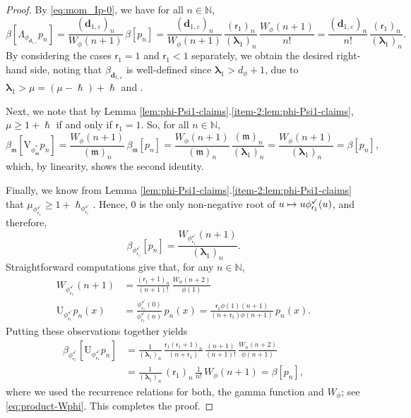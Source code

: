\documentclass[10pt]{amsart}
\let\epsilon\varepsilon
\newcommand\mto{\mathchoice{\longmapsto}{\mapsto}{\mapsto}{\mapsto}}
\theoremstyle{plain}
\theoremstyle{definition}
\newcommand{\N}{\mathbb{N}}
\newcommand{\m}{\mathfrak{m}}
\newcommand{\dz}{{\bm{d}}_{1,\epsilon}}
\newcommand{\lam}{{\bm{\lambda}_1}}
\newcommand{\vat}{{\mathsf{r}_1}}
\newcommand{\phm}{{\phi_\m^*}}
\renewcommand{\varphi}{{\phi_{\vat}^{\checkmark}}}
\newcommand{\gab}[1][\lam,\mo]{{\beta_{#1}}}
\let\h\hslash
\let\mo\mu
\let\bpsi\beta
\begin{document}
\begin{proof}
By \eqref{eq:mom_Ip-0}, we have for all $n \in \N$,
\begin{equation*}
\bpsi[\Lambda_{\phi_{\dz}} p_n] = \frac{(\dz)_n}{W_{\phi}(n+1)}\, \bpsi[p_n]=
\frac{(\dz)_n}{W_{\phi}(n+1)}\, \frac{(\vat)_n}{(\lam)_n}\,\frac{W_{\phi}(n+1)}{n!} =\frac{(\dz)_n}{n!}\, \frac{(\vat)_n}{(\lam)_n}.
\end{equation*}
By considering the cases $\vat=1$ and $\vat<1$ separately, we obtain the desired right-hand side, noting that $\gab[\dz]$ is well-defined since $\lam > d_\phi +1$, due to $ \lam > \mo = (\mo-\h) + \h$ and \cite[Prop.\,4.4(1)]{Patie-Savov-GeL}.

Next, we note that by Lemma \ref{lem:phi-Psi1-claims}.\eqref{item-2:lem:phi-Psi1-claims},
$\mo \geq 1+\h$ if and only if $\vat = 1$. So, for all $n \in \N$,
\begin{equation*}
\gab[\m] [\mathrm{V}_{\phm} p_n] = \frac{W_{\phi}(n+1)}{(\m)_n}\, \gab[\m] [p_n] = \frac{W_{\phi}(n+1)}{(\m)_n}\, \frac{(\m)_n}{(\lam)_n} = \frac{W_{\phi}(n+1)}{(\lam)_n} = \bpsi[p_n],
\end{equation*}
which, by linearity, shows the second identity.

Finally, we know from Lemma \ref{lem:phi-Psi1-claims}.\eqref{item-2:lem:phi-Psi1-claims} that
$\mo_\varphi \geq 1+\h_\varphi$. Hence, $0$ is the only non-negative root of $u \mto u\varphi(u)$, and therefore,
\begin{equation*}
\bpsi_\varphi [p_n] = \frac{W_\varphi(n+1)}{(\lam)_n}.
\end{equation*}
Straightforward computations give that, for any $n \in \N$,
\begin{align*}
W_\varphi(n+1) &= \frac{(\vat+1)_{n}}{(n+1)!}\, \frac{W_\phi(n+2)}{\phi(1)} \\
\tag*{and} \mathrm{U}_\varphi p_n(x) &= \frac{\varphi(0)}{\varphi(n)}\, p_n(x) = \frac{\vat\phi(1)(n+1)}{(n+\vat)\phi(n+1)}\, p_n(x).
\end{align*}
Putting these observations together yields
\begin{align*}
\bpsi_\varphi[\mathrm{U}_\varphi p_n]&= \frac{1}{(\lam)_n}\, \frac{\vat (\vat+1)_{n}}{(n+\vat)}\, \frac{(n+1)}{(n+1)!}\, \frac{W_{\phi}(n+2)}{\phi(n+1)}\\
&=\frac{1}{(\lam)_n}\, (\vat)_n\, \frac{1}{n!}\, W_\phi(n+1) = \bpsi[p_n],
\end{align*}
where we used the recurrence relations for both, the gamma function and $W_\phi$; see \eg \eqref{eq:product-Wphi}.
This completes the proof.
\end{proof}
\end{document}
